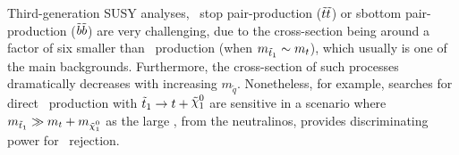 				Third-generation SUSY analyses, \eg\ stop pair-production ($\tilde{t}\tilde{t}$) or sbottom pair-production ($\tilde{b}\tilde{b}$) are very challenging, due to the cross-section being around a factor of six smaller than \ttbar\ production (when $m_{\tilde{t}_1} \sim m_t$), which usually is one of the main backgrounds. Furthermore, the cross-section of such processes dramatically decreases with increasing $m_{\tilde{q}}$. Nonetheless, for example, searches for direct \stopone\ production with $\stopone \ra t + \ninoone$ are sensitive in a scenario where $m_{\stopone} \gg m_t + m_{\ninoone}$ as the large \met, from the neutralinos, provides discriminating power for \ttbar\ rejection.
				